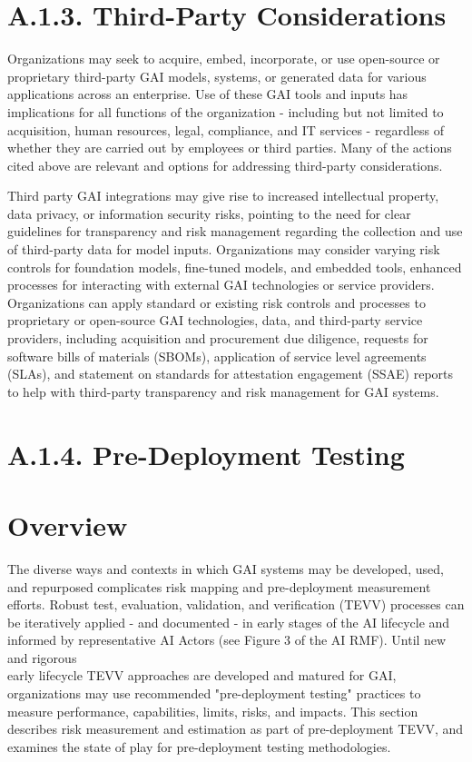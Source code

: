 \documentclass[10pt]{article}
\begin{document}
\section*{A.1.3. Third-Party Considerations}
Organizations may seek to acquire, embed, incorporate, or use open-source or proprietary third-party GAI models, systems, or generated data for various applications across an enterprise. Use of these GAI tools and inputs has implications for all functions of the organization - including but not limited to acquisition, human resources, legal, compliance, and IT services - regardless of whether they are carried out by employees or third parties. Many of the actions cited above are relevant and options for addressing third-party considerations.

Third party GAI integrations may give rise to increased intellectual property, data privacy, or information security risks, pointing to the need for clear guidelines for transparency and risk management regarding the collection and use of third-party data for model inputs. Organizations may consider varying risk controls for foundation models, fine-tuned models, and embedded tools, enhanced processes for interacting with external GAI technologies or service providers. Organizations can apply standard or existing risk controls and processes to proprietary or open-source GAI technologies, data, and third-party service providers, including acquisition and procurement due diligence, requests for software bills of materials (SBOMs), application of service level agreements (SLAs), and statement on standards for attestation engagement (SSAE) reports to help with third-party transparency and risk management for GAI systems.
\section*{A.1.4. Pre-Deployment Testing}
\section*{Overview}
The diverse ways and contexts in which GAI systems may be developed, used, and repurposed complicates risk mapping and pre-deployment measurement efforts. Robust test, evaluation, validation, and verification (TEVV) processes can be iteratively applied - and documented - in early stages of the AI lifecycle and informed by representative AI Actors (see Figure 3 of the AI RMF). Until new and rigorous\\
early lifecycle TEVV approaches are developed and matured for GAI, organizations may use recommended "pre-deployment testing" practices to measure performance, capabilities, limits, risks, and impacts. This section describes risk measurement and estimation as part of pre-deployment TEVV, and examines the state of play for pre-deployment testing methodologies.
\end{document}
